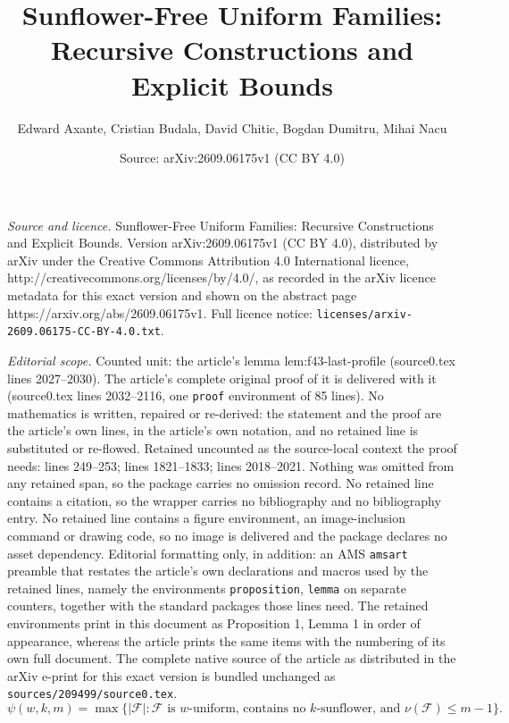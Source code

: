 \documentclass[10pt,a4paper]{amsart}
\title{Sunflower-Free Uniform Families: Recursive Constructions and Explicit Bounds}
\author{Edward Axante, Cristian Budala, David Chitic, Bogdan Dumitru, Mihai Nacu}
\date{Source: arXiv:2609.06175v1 (CC BY 4.0)}
\newcommand{\F}{\mathcal F}
\begin{document}
\maketitle

\noindent\emph{Source and licence.} Sunflower-Free Uniform Families: Recursive Constructions and Explicit Bounds. Version arXiv:2609.06175v1 (CC BY 4.0), distributed by arXiv under the Creative Commons Attribution 4.0 International licence, http://creativecommons.org/licenses/by/4.0/, as recorded in the arXiv licence metadata for this exact version and shown on the abstract page https://arxiv.org/abs/2609.06175v1. Full licence notice: \texttt{licenses/arxiv-2609.06175-CC-BY-4.0.txt}.\par\smallskip

\noindent\textit{Editorial scope.} Counted unit: the article's lemma lem:f43-last-profile (source0.tex lines 2027--2030). The article's complete original proof of it is delivered with it (source0.tex lines 2032--2116, one \texttt{proof} environment of 85 lines). No mathematics is written, repaired or re-derived: the statement and the proof are the article's own lines, in the article's own notation, and no retained line is substituted or re-flowed.  Retained uncounted as the source-local context the proof needs: lines 249--253; lines 1821--1833; lines 2018--2021.  Nothing was omitted from any retained span, so the package carries no omission record.  No retained line contains a citation, so the wrapper carries no bibliography and no bibliography entry.  No retained line contains a figure environment, an image-inclusion command or drawing code, so no image is delivered and the package declares no asset dependency.  Editorial formatting only, in addition: an AMS \texttt{amsart} preamble that restates the article's own declarations and macros used by the retained lines, namely the environments \texttt{proposition}, \texttt{lemma} on separate counters, together with the standard packages those lines need.  The retained environments print in this document as Proposition 1, Lemma 1 in order of appearance, whereas the article prints the same items with the numbering of its own full document.  The complete native source of the article as distributed in the arXiv e-print for this exact version is bundled unchanged as \texttt{sources/209499/source0.tex}.
\begin{equation}
 \psi(w,k,m)=\max\bigl\{|\F|:\F\text{ is $w$-uniform, contains no
 $k$-sunflower, and }\nu(\F)\le m-1\bigr\}.
 \label{eq:psi-definition}
\end{equation}
\end{document}
